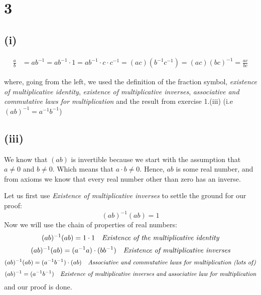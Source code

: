 \documentclass{article}
\begin{document}
\section*{3}

\subsection*{(i)}

\begin{align*}
	\frac{a}{b} &= ab^{-1} = ab^{-1} \cdot 1 = ab^{-1} \cdot c \cdot c^{-1} = (ac)(b^{-1}c^{-1}) = (ac)(bc)^{-1} = \frac{ac}{bc}
\end{align*}

where, going from the left, we used the definition of the fraction symbol, \emph{existence of multiplicative identity},
\emph{existence of multiplicative inverses}, \emph{associative and commutative laws for multiplication} and 
the result from exercise 1.(iii) (i.e \((ab)^{-1} = a^{-1}b^{-1}\))


\subsection*{(iii)}

We know that \((ab)\) is invertible because we start with the assumption that \(a \neq 0\) and \(b \neq 0\).
Which means that \(a \cdot b \neq 0\). Hence, \(ab\) is some real number, and from axioms we know that
every real number other than zero has an inverse.  

Let us first use \emph{Existence of multiplicative inverses} to settle the ground for our proof:
\begin{equation*}
	(ab)^{-1}(ab) = 1
\end{equation*}
Now we will use the chain of properties of real numbers:
\begin{equation*}
	(ab)^{-1}(ab) = 1 \cdot 1 \ \ \ \emph{Existence of the multiplicative identity}
\end{equation*}
\begin{equation*}
	(ab)^{-1}(ab) = (a^{-1}a) \cdot (bb^{-1}) \ \ \ \emph{Existence of multiplicative inverses}
\end{equation*}
\begin{equation*}
	(ab)^{-1}(ab) = (a^{-1}b^{-1}) \cdot (ab) \ \ \ \emph{Associative and commutative laws for multiplication (lots of)} 
\end{equation*}
\begin{equation*}
	(ab)^{-1} = (a^{-1}b^{-1}) \ \ \ \emph{Existence of multiplicative inverses and associative law for multiplication} 
\end{equation*}
and our proof is done.
\end{document}
